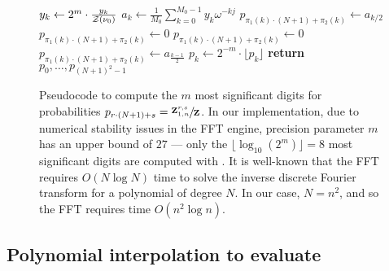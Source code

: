 \begin{figure}[!ht]
\begin{algorithmic}[1]
\State $y_k \gets 2^m \cdot \frac{y_k}{{\mathcal Z}_{}(\nu_0)}$
\EndFor
{}
\State $a_k \gets \frac{1}{M_0} \sum_{k=0}^{M_0-1} y_k \omega^{-kj}$
\EndFor
{}
\State $p_{\pi_1(k) \cdot (N+1) + \pi_2(k)} \gets a_{k/2}$
\Else
\State $p_{\pi_1(k) \cdot (N+1) + \pi_2(k)} \gets 0$
\EndIf
\Else
{}
\State $p_{\pi_1(k) \cdot (N+1) + \pi_2(k)} \gets 0$
\Else
\State $p_{\pi_1(k) \cdot (N+1) + \pi_2(k)} \gets a_{\frac{k-1}{2}}$
\EndIf
\EndIf
\EndFor
{}
\State $p_k \gets 2^{-m} \cdot \lfloor p_k \rfloor$
\EndFor
\State \textbf{return} $p_0,\dots,p_{(N + 1)^2 - 1}$
\EndFunction
\rule[-0.35ex]{0pt}{0pt}
\end{algorithmic}
\caption{
Pseudocode to compute the $m$ most significant digits
for probabilities
$p_{r\cdot(N + 1)+s} = \sfrac{{\bf Z}^{r,s}_{1,n}}{{\bf Z}^{}_{}}$. In our implementation,
due to numerical stability issues in the FFT engine, precision parameter
$m$ has an upper bound of $27$ --- only the $\lfloor \log_{10}(2^m) \rfloor =8$ most significant digits
are computed with \ffttwo. It is well-known that
the FFT requires $O(N \log N)$ time to solve the inverse discrete
Fourier transform for a polynomial of degree $N$. In our case,
$N=n^2$, and so the FFT requires time $O(n^2 \log n)$.
}
\end{figure}

\subsection{Polynomial interpolation to evaluate
\texorpdfstring{}{}}
\label{subsec:ffttwo:fft}

